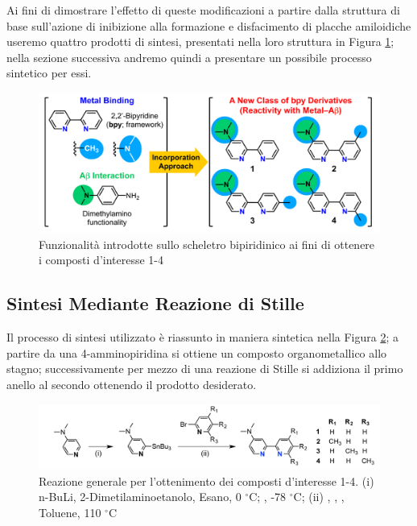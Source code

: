 \documentclass[a4paper, 12pt]{article}
\begin{document}
Ai fini di dimostrare l'effetto di queste modificazioni a partire dalla struttura di base sull'azione di inibizione alla formazione e disfacimento di placche amiloidiche useremo quattro prodotti di sintesi, presentati nella loro struttura in Figura \ref{fig:bpy_mod}; nella sezione successiva andremo quindi a presentare un possibile processo sintetico per essi.

\begin{figure}[H]
	\centering
	\includegraphics[width=\linewidth]{immagini/bpy_mod.png}
	\caption{Funzionalità introdotte sullo scheletro bipiridinico ai fini di ottenere i composti d'interesse 1-4}
	\label{fig:bpy_mod}
\end{figure}

\subsection{Sintesi Mediante Reazione di Stille}
\label{sec:bpy_stille}
Il processo di sintesi utilizzato è riassunto in maniera sintetica nella Figura \ref{fig:rea_g}; a partire da una 4-amminopiridina si ottiene un composto organometallico allo stagno; successivamente per mezzo di una reazione di Stille si addiziona il primo anello al secondo ottenendo il prodotto desiderato.

\begin{figure}[H]
	\centering
	\includegraphics[width=\linewidth]{immagini/rea_g.png}
	\caption{Reazione generale per l'ottenimento dei composti d'interesse 1-4. (i) n-BuLi, 2-Dimetilaminoetanolo, Esano, 0 $^\circ$C; , -78 $^\circ$C; (ii) , , , Toluene, 110 $^\circ$C }
	\label{fig:rea_g}
\end{figure}
\end{document}
